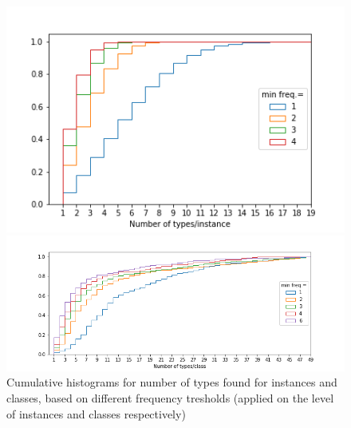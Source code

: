 \begin{figure}
\begin{minipage}[b]{0.4\linewidth}
\includegraphics[scale=.4]{figures/types_instances.png}
\end{minipage}
\begin{minipage}[b]{0.6\linewidth}
\includegraphics[scale=.4]{figures/types_classes.png}
\end{minipage}
 \caption{\label{fig:ntypes} Cumulative histograms for number of types found for instances and classes, based on different frequency tresholds (applied on the level of instances and classes respectively)}
\end{figure}

